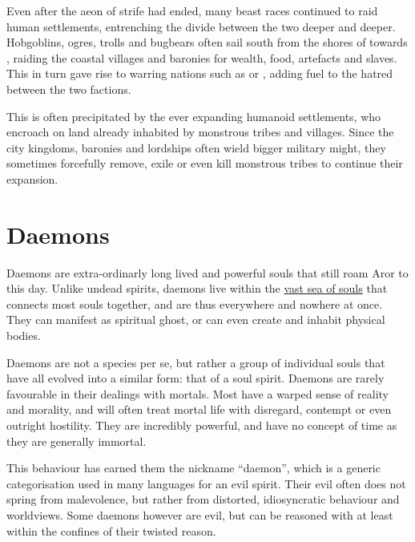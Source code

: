 Even after the aeon of strife had ended, many beast races continued to raid
human settlements, entrenching the divide between the two deeper and deeper.
Hobgoblins, ogres, trolls and bugbears often sail south from the shores of
 towards , raiding the coastal
villages and baronies for wealth, food, artefacts and slaves. This in turn
gave rise to warring nations such as  or
, adding fuel to the hatred between the two factions.

This is often precipitated by the ever expanding humanoid settlements, who
encroach on land already inhabited by monstrous tribes and villages. Since the
city kingdoms, baronies and lordships often wield bigger military might, they
sometimes forcefully remove, exile or even kill monstrous tribes to continue
their expansion.











\section{Daemons}
\label{sec:Daemons}

Daemons are extra-ordinarly long lived and powerful souls that still roam Aror
to this day. Unlike undead spirits, daemons live within the \hyperref[sec:Soul
  Well]{vast sea of souls} that connects most souls together, and are thus
everywhere and nowhere at once. They can manifest as spiritual ghost, or can
even create and inhabit physical bodies.

Daemons are not a species per se, but rather a group of individual souls that
have all evolved into a similar form: that of a soul spirit. Daemons are
rarely favourable in their dealings with mortals. Most have a warped sense of
reality and morality, and will often treat mortal life with disregard,
contempt or even outright hostility. They are incredibly powerful, and have
no concept of time as they are generally immortal.

This behaviour has earned them the nickname ``daemon'', which is a generic
categorisation used in many languages for an evil spirit. Their evil often
does not spring from malevolence, but rather from distorted, idiosyncratic
behaviour and worldviews. Some daemons however are evil, but can be reasoned
with at least within the confines of their twisted reason.

